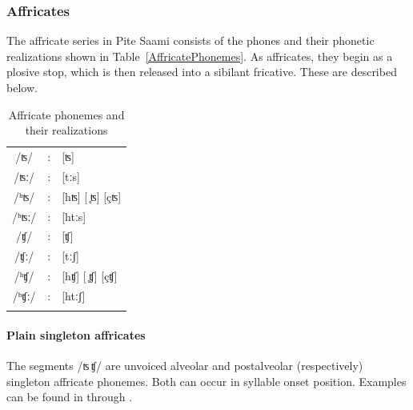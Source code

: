\FB

\subsubsection{Affricates}\label{Affricates}
The affricate series in Pite Saami consists of the phones and their phonetic realizations shown in Table~\vref{AffricatePhonemes}. 
As affricates, they begin as a plosive stop, which is then released into a sibilant fricative. %
These are described below.
\begin{table}[htb]\centering
\caption{Affricate phonemes and their realizations}\label{AffricatePhonemes}
\begin{tabular}{c c l}\mytoprule
/ʦ/ &:& [ʦ] \\ %
/ʦː/ &:& [tːs] \\ %
/ʰʦ/ &:& [hʦ] [ ̥ʦ] [çʦ] \\ %
/ʰʦː/ &:& [htːs] \\ %
/ʧ/ &:& [ʧ] \\ %
/ʧː/ &:& [tːʃ] \\ %
/ʰʧ/ &:& [hʧ] [ ̥ʧ] [çʧ]  \\ %
/ʰʧː/ &:& [htːʃ] \\ %
\mybottomrule
\end{tabular}
\end{table}


\paragraph{Plain singleton affricates}\label{tstj}
The segments /ʦ\,ʧ/ are unvoiced alveolar and postalveolar (respectively) singleton affricate phonemes. Both can occur in syllable onset position. Examples can be found in  through .

